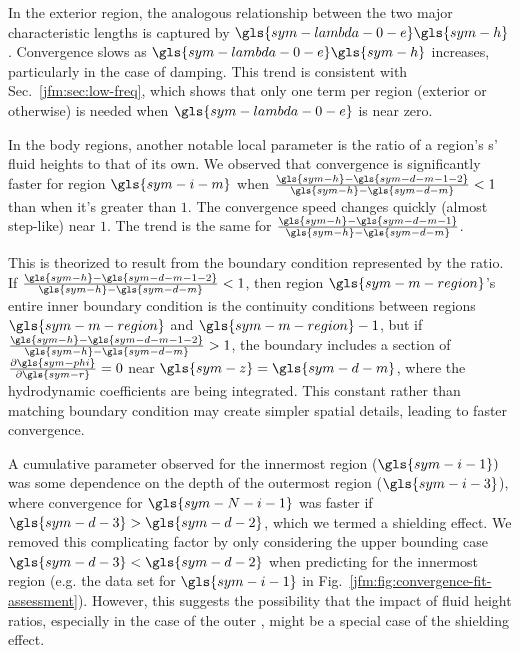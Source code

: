 \documentclass[lineno]{JFM-FLM_Au}
\begin{document}
In the exterior region, the analogous relationship between the two major characteristic lengths is captured by $\gls{sym-lambda-0-e}\gls{sym-h}$.
Convergence slows as $\gls{sym-lambda-0-e}\gls{sym-h}$ increases, particularly in the case of damping.
This trend is consistent with Sec.~\ref{jfm:sec:low-freq}, which shows that only one term per region (exterior or otherwise) is needed when $\gls{sym-lambda-0-e}$ is near zero.

In the body regions, another notable local parameter is the ratio of a region's \neighbour{}s' fluid heights to that of its own.
We observed that convergence is significantly faster for region $\gls{sym-i-m}$ when $\frac{\gls{sym-h}-\gls{sym-d-m-1-2}}{\gls{sym-h}-\gls{sym-d-m}} < 1$ than when it's greater than $1$.
The convergence speed changes quickly (almost step-like) near $1$.
The trend is the same for $\frac{\gls{sym-h}-\gls{sym-d-m-1}}{\gls{sym-h}-\gls{sym-d-m}}$.

This is theorized to result from the boundary condition represented by the ratio.
If $\frac{\gls{sym-h}-\gls{sym-d-m-1-2}}{\gls{sym-h}-\gls{sym-d-m}} < 1$, then region $\gls{sym-m-region}$'s entire inner boundary condition is the continuity conditions between regions $\gls{sym-m-region}$ and $\gls{sym-m-region}-1$, but if $\frac{\gls{sym-h}-\gls{sym-d-m-1-2}}{\gls{sym-h}-\gls{sym-d-m}} > 1$, the boundary includes a section of $\frac{\partial \gls{sym-phi}}{\partial \gls{sym-r}} = 0$ near $\gls{sym-z} = \gls{sym-d-m}$, where the hydrodynamic coefficients are being integrated.
This constant rather than matching boundary condition may create simpler spatial details, leading to faster convergence.

A cumulative parameter observed for the innermost region ($\gls{sym-i-1})$ was some dependence on the depth of the outermost region ($\gls{sym-i-3}$), where convergence for $\gls{sym-N-i-1}$ was faster if $\gls{sym-d-3} > \gls{sym-d-2}$, which we termed a shielding effect. 
We removed this complicating factor by only considering the upper bounding case $\gls{sym-d-3} < \gls{sym-d-2}$ when predicting for the innermost region (e.g. the data set for $\gls{sym-i-1}$ in Fig.~\ref{jfm:fig:convergence-fit-assessment}). 
However, this suggests the possibility that the impact of fluid height ratios, especially in the case of the outer \neighbour{}, might be a special case of the shielding effect.
\end{document}
